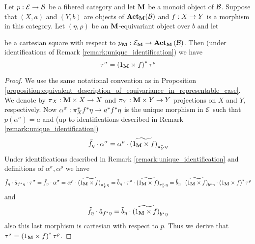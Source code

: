 \begin{proposition}\label{proposition:equivariant_pullbacks_description}
Let $p:{\mathcal E} \rightarrow {\mathcal B}$ be a fibered category and let $\mathbf{M}$ be a monoid object of ${\mathcal B}$. Suppose that $(X,a)$ and $(Y,b)$ are objects of $\mathbf{Act}_{\mathbf{M}}({\mathcal B})$ and $f:X\rightarrow Y$ is a morphism in this category. Let $(\eta,\rho)$ be an $\mathbf{M}$-equivariant object over $b$ and let
\begin{center}
\end{center}
be a cartesian square with respect to $p_{\mathbf{M}}:{\mathcal E}_{\mathbf{M}}\rightarrow \mathbf{Act}_{\mathbf{M}}\left({\mathcal B}\right)$. Then (under identifications of Remark \ref{remark:unique_identification}) we have
$$\tau^{\sigma} = \left(1_{\mathbf{M}}\times f\right)^*\tau^{\rho}$$
\end{proposition}
\begin{proof}
We use the same notational convention as in Proposition \ref{proposition:equivalent_description_of_equivariance_in_representable_case}. We denote by $\pi_X:\mathbf{M}\times X\rightarrow X$ and $\pi_Y:\mathbf{M}\times Y\rightarrow Y$ projections on $X$ and $Y$, respectively. Now $\alpha^{\sigma}:\pi^*_Xf^*\eta \rightarrow a^*f^*\eta$ is the unique morphism in ${\mathcal E}$ such that $p(\alpha^\sigma) = a$ and (up to identifications described in Remark \ref{remark:unique_identification})
$$\tilde{f}_{\eta}  \cdot \alpha^{\sigma} = \alpha^{\rho}\cdot \widetilde{\left(1_{\mathbf{M}}\times f\right)}_{\pi^*_Y\eta}$$
Under identifications described in Remark \ref{remark:unique_identification} and definitions of $\alpha^{\sigma},\alpha^{\rho}$ we have
$$\tilde{f}_{\eta} \cdot \tilde{a}_{f^*\eta} \cdot \tau^{\sigma} = \tilde{f}_{\eta}  \cdot \alpha^{\sigma} = \alpha^{\rho}\cdot \widetilde{\left(1_{\mathbf{M}}\times f\right)}_{\pi^*_Y\eta} = \tilde{b}_{\eta} \cdot \tau^{\rho}\cdot \widetilde{\left(1_{\mathbf{M}}\times f\right)}_{\pi^*_Y\eta} = \tilde{b}_{\eta}\cdot \widetilde{\left(1_{\mathbf{M}}\times f\right)}_{b^*\eta} \cdot \left(1_{\mathbf{M}}\times f\right)^*\tau^{\rho}$$
and
$$\tilde{f}_{\eta} \cdot \tilde{a}_{f^*\eta} = \tilde{b}_{\eta}\cdot \widetilde{\left(1_{\mathbf{M}}\times f\right)}_{b^*\eta}$$
also this last morphism is cartesian with respect to $p$. Thus we derive that $\tau^{\sigma} = \left(1_{\mathbf{M}}\times f\right)^*\tau^{\rho}$.
\end{proof}

